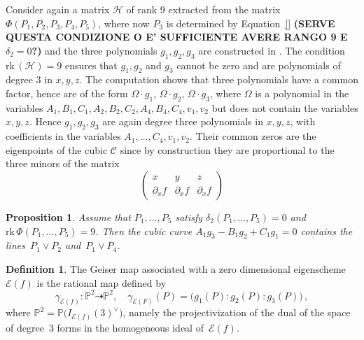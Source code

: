 \documentclass{amsart}
\theoremstyle{plain}
\newtheorem{prop}[lemma]{Proposition}
\theoremstyle{definition}
\newtheorem{definition}[lemma]{Definition}
\newcommand{\p}{\mathbb{P}}
\newcommand{\Eig}[1]{\mathcal{E}\!\left( {#1} \right)}
\newcommand{\cbc}{\ensuremath{\mathcal{C}}}
\newcommand{\rk}{\ensuremath{\mathrm{rk}}}
\begin{document}
Consider again a matrix $\mathcal{H}$ of rank $9$ extracted from
the matrix $\Phi(P_1, P_2, P_3, P_4, P_5)$, where now $P_3$ is determined by Equation~\eqref{} \textbf{(SERVE QUESTA CONDIZIONE O E' SUFFICIENTE AVERE RANGO 9 E $\delta_2 = 0$?)}
and the three polynomials $g_1, g_2, g_3$ are constructed
in . The condition
$\rk \,(\mathcal{H}) = 9$ ensures that
$g_1, g_2$ and $g_3$ cannot be zero and are polynomials of degree
$3$ in $x, y, z$.
The computation shows that three polynomials have a common factor,
hence are of the form $\Omega \cdot g_1$, $\Omega \cdot g_2$, $\Omega \cdot g_3$, where
$\Omega$ is a polynomial in the variables
$A_1, B_1, C_1, A_2, B_2, C_2, A_4, B_4, C_4, v_1, v_2$ but
does not contain the variables $x, y, z$.
Hence $g_1, g_2, g_3$ are again
degree three polynomials in $x, y, z$, with coefficients in the variables
$A_1, \dots, C_4, v_1, v_2$. Their common zeros are the eigenpoints of the
cubic $\cbc$ since by construction they are proportional to the three minors of the matrix
%
\[
  \left(
  \begin{array}{ccc}
    x & y & z \\
    \partial_x f & \partial_x f & \partial_x f
  \end{array}
  \right)
\]
%

\begin{prop}
\label{proposition:G_split}
Assume that $P_1, \dots, P_5 $ satisfy $\delta_2(P_1, \dotsc, P_5) = 0$ and $\rk \, \Phi(P_1, \dotsc, P_5) = 9$. Then the cubic curve $A_1 g_3 - B_1 g_2 + C_1 g_1=0$ contains the lines~$P_1 \vee P_2$ and~$P_1 \vee P_4$.
\end{prop}

\begin{definition}
%
The Geiser map associated with a zero dimensional eigenscheme $\Eig{f}$ is the rational map defined by
%
\[
  \gamma_{\Eig{f}} \colon \p ^2 \dasharrow \p^2, \quad
  \gamma_{\Eig{F}} (P) = \bigl( g_1(P):g_2(P):g_3(P) \bigr) \,,
\]
%
where $\p^2 = \p\bigl(I_{\Eig{f}}(3)^{\vee}\bigr)$, namely the projectivization of the dual of the space of degree~$3$ forms in the homogeneous ideal of~$\Eig{f}$.
\end{definition}
\end{document}
